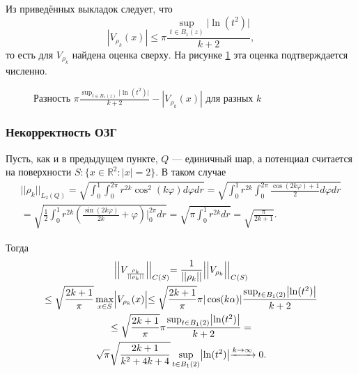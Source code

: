 \documentclass[a4paper]{article}
\newcommand{\R}[1]{\mathbb{R}^#1}
\begin{document}
Из приведённых выкладок следует, что
\begin{equation}
  | V_{\rho_k}(x)| \leq \pi \frac{\sup_{t \in B_1(z)} \bigl| \ln (t^2) \bigl|}{k+2},
\end{equation}
то есть для $V_{\rho_k}$ найдена оценка сверху. На рисунке \ref{chis} эта оценка подтверждается численно.
\begin{figure}[h!]
  \noindent{}
  \caption{Разность $\pi \frac{\sup_{t \in B_1(z)} \bigl| \ln (t^2) \bigl|}{k+2} -| V_{\rho_k}(x)| $ для разных $k$}
  \label{chis}
\end{figure}

\subsubsection{Некорректность ОЗГ}
Пусть, как и в предыдущем пункте, $Q$ --- единичный шар, а потенциал считается на поверхности $S: \{x\in \R{2}: |x|=2 \}$. В таком случае
\begin{multline}
  ||\rho_k ||_{L_2(Q)}=\sqrt{\int_0^1 \int_0^{2 \pi} r^{2k} \cos^2(k \varphi) d\varphi dr}= \sqrt{\int_0^1 r^{2k} \int_0^{2 \pi} \frac{\cos(2k \varphi)+1}{2}  d\varphi dr}\\
  =\sqrt{\frac{1}{2} \int_0^1 r^{2k} \left( \frac{\sin(2k \varphi)}{2k} +\varphi\right)\Biggl|_0^{2 \pi} dr}= \sqrt{\pi \int_0^1 r^{2k} dr}=\sqrt{\frac{\pi}{2k+1}}.
\end{multline}

Тогда
\begin{multline}
  \Bigl|\Bigl|V_{\frac{\rho_k}{||\rho_k ||}}\Bigl|\Bigl|_{C(S)}= \frac{1}{||\rho_k ||} \Bigl|\Bigl|V_{\rho_k}  \Bigl|\Bigl|_{C(S)} \\
  \leq \sqrt{\frac{2k+1}{\pi}} \max_{x \in S} \Bigl| V_{\rho_k}(x) \Bigl| \leq \sqrt{\frac{2k+1}{\pi}} \pi |\cos(k\alpha)| \frac{\sup_{t \in B_1(2)} \bigl| \ln (t^2) \bigl|}{k+2} \\
  \leq \sqrt{\frac{2k+1}{\pi}} \pi \frac{\sup_{ t \in B_1(2)} \bigl| \ln (t^2) \bigl|}{k+2} = \\
  \sqrt{\pi} \sqrt{\frac{2k+1}{k^2 + 4k+4}}\sup_{t \in B_1(2)} \bigl| \ln (t^2) \bigl| \xrightarrow{k \rightarrow \infty} 0.
\end{multline}
\end{document}
